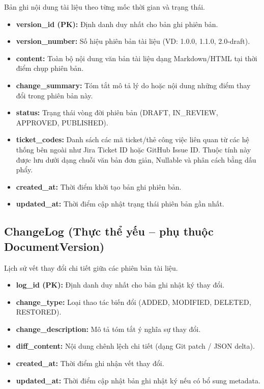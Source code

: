 Bản ghi nội dung tài liệu theo từng mốc thời gian và trạng thái.

\begin{itemize}
    \item \textbf{version\_id (PK):} Định danh duy nhất cho bản ghi phiên bản.
    \item \textbf{version\_number:} Số hiệu phiên bản tài liệu (VD: 1.0.0, 1.1.0, 2.0-draft).
    \item \textbf{content:} Toàn bộ nội dung văn bản tài liệu dạng Markdown/HTML tại thời điểm chụp phiên bản.
    \item \textbf{change\_summary:} Tóm tắt mô tả lý do hoặc nội dung những điểm thay đổi trong phiên bản này.
    \item \textbf{status:} Trạng thái vòng đời phiên bản (DRAFT, IN\_REVIEW, APPROVED, PUBLISHED).
    \item \textbf{ticket\_codes:} Danh sách các mã ticket/thẻ công việc liên quan từ các hệ thống bên ngoài như Jira Ticket ID hoặc GitHub Issue ID. Thuộc tính này được lưu dưới dạng chuỗi văn bản đơn giản, Nullable và phân cách bằng dấu phẩy.
    \item \textbf{created\_at:} Thời điểm khởi tạo bản ghi phiên bản.
    \item \textbf{updated\_at:} Thời điểm cập nhật trạng thái phiên bản gần nhất.
\end{itemize}


\subsection{ChangeLog (Thực thể yếu -- phụ thuộc DocumentVersion)}

Lịch sử vết thay đổi chi tiết giữa các phiên bản tài liệu.

\begin{itemize}
    \item \textbf{log\_id (PK):} Định danh duy nhất cho bản ghi nhật ký thay đổi.
    \item \textbf{change\_type:} Loại thao tác biến đổi (ADDED, MODIFIED, DELETED, RESTORED).
    \item \textbf{change\_description:} Mô tả tóm tắt ý nghĩa sự thay đổi.
    \item \textbf{diff\_content:} Nội dung chênh lệch chi tiết (dạng Git patch / JSON delta).
    \item \textbf{created\_at:} Thời điểm ghi nhận vết thay đổi.
    \item \textbf{updated\_at:} Thời điểm cập nhật bản ghi nhật ký nếu có bổ sung metadata.
\end{itemize}


